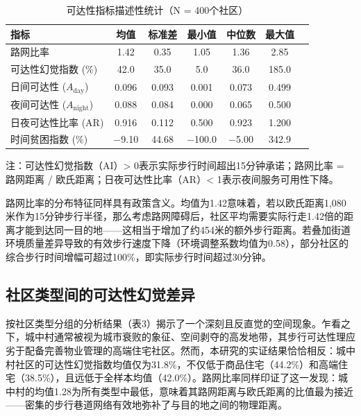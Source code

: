 \documentclass[10pt,conference]{IEEEtran}
\begin{document}
\begin{table}[htbp]
\caption{可达性指标描述性统计（N = 400个社区）}
\label{tab:descriptive}
\begin{center}
\begin{threeparttable}
\begin{tabular}{lcccccc}
\toprule
指标 & 均值 & 标准差 & 最小值 & 中位数 & 最大值 \\
\midrule
路网比率 & 1.42 & 0.35 & 1.05 & 1.36 & 2.85 \\
可达性幻觉指数 ($\%$) & 42.0 & 35.0 & 5.0 & 36.0 & 185.0 \\
日间可达性 ($A_{\text{day}}$) & 0.096 & 0.093 & 0.001 & 0.073 & 0.499 \\
夜间可达性 ($A_{\text{night}}$) & 0.088 & 0.084 & 0.000 & 0.065 & 0.500 \\
日夜可达性比率 (AR) & 0.916 & 0.112 & 0.500 & 0.923 & 1.200 \\
时间贫困指数 ($\%$) & $-$9.10 & 44.68 & $-$100.0 & $-$5.00 & 342.9 \\
\bottomrule
\end{tabular}
\begin{tablenotes}
\item 注：可达性幻觉指数（AI）> 0表示实际步行时间超出15分钟承诺；路网比率 = 路网距离 / 欧氏距离；日夜可达性比率（AR）< 1表示夜间服务可用性下降。
\end{tablenotes}
\end{threeparttable}
\end{center}
\end{table}

路网比率的分布特征同样具有政策含义。均值为1.42意味着，若以欧氏距离1,080米作为15分钟步行半径，那么考虑路网障碍后，社区平均需要实际行走1.42倍的距离才能到达同一目的地——这相当于增加了约454米的额外步行距离。若叠加街道环境质量差异导致的有效步行速度下降（环境调整系数均值为0.58），部分社区的综合步行时间增幅可超过100\%，即实际步行时间超过30分钟。

\subsection{社区类型间的可达性幻觉差异}

按社区类型分组的分析结果（表3）揭示了一个深刻且反直觉的空间现象。乍看之下，城中村通常被视为城市衰败的象征、空间剥夺的高发地带，其步行可达性理应劣于配备完善物业管理的高端住宅社区。然而，本研究的实证结果恰恰相反：城中村社区的可达性幻觉指数均值仅为31.8\%，不仅低于商品住宅（44.2\%）和高端住宅（38.5\%），且远低于全样本均值（42.0\%）。路网比率同样印证了这一发现：城中村的均值1.28为所有类型中最低，意味着其路网距离与欧氏距离的比值最为接近——密集的步行巷道网络有效地弥补了与目的地之间的物理距离。
\end{document}
